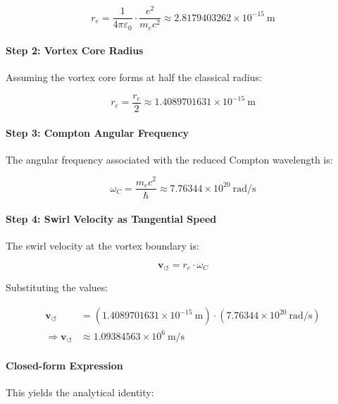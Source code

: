 \documentclass[11pt]{article}
\begin{document}
    \begin{equation}
        r_e = \frac{1}{4\pi\varepsilon_0} \cdot \frac{e^2}{m_e c^2} \approx 2.8179403262 \times 10^{-15}~\text{m}
    \end{equation}

    \paragraph{Step 2: Vortex Core Radius}
    Assuming the vortex core forms at half the classical radius:

    \begin{equation}
        r_c = \frac{r_e}{2} \approx 1.4089701631 \times 10^{-15}~\text{m}
    \end{equation}

    \paragraph{Step 3: Compton Angular Frequency}
    The angular frequency associated with the reduced Compton wavelength is:

    \begin{equation}
        \omega_C = \frac{m_e c^2}{\hbar} \approx 7.76344 \times 10^{20}~\text{rad/s}
    \end{equation}

    \paragraph{Step 4: Swirl Velocity as Tangential Speed}
    The swirl velocity at the vortex boundary is:

    \begin{equation}
        \mathbf{v}_{\scriptscriptstyle\boldsymbol{\circlearrowleft}} = r_c \cdot \omega_C
    \end{equation}

    \noindent
    Substituting the values:

    \begin{align}
        \mathbf{v}_{\scriptscriptstyle\boldsymbol{\circlearrowleft}} &= \left(1.4089701631 \times 10^{-15}~\text{m}\right) \cdot \left(7.76344 \times 10^{20}~\text{rad/s}\right) \nonumber \\
        \Rightarrow \mathbf{v}_{\scriptscriptstyle\boldsymbol{\circlearrowleft}} &\approx \boxed{1.09384563 \times 10^6~\text{m/s}}
    \end{align}

    \paragraph{Closed-form Expression}
    This yields the analytical identity:
\end{document}
